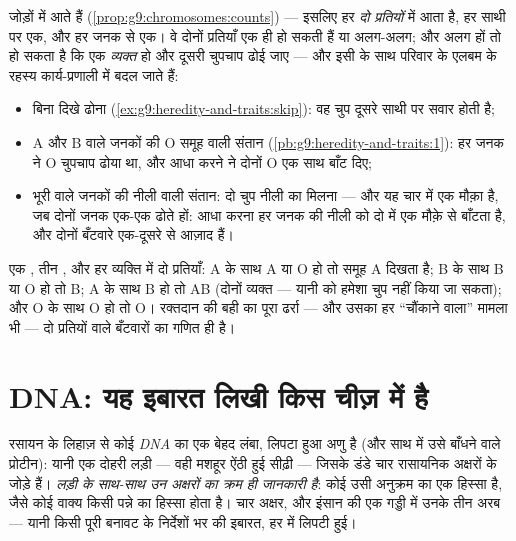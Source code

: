 \begin{proposition}[दो प्रतियाँ, और दिखने का मतलब]\label{prop:g9:genes-and-dna:twocopies}
 जोड़ों में आते हैं (\cref{prop:g9:chromosomes:counts}) ---
इसलिए हर  \emph{दो प्रतियों} में आता है, हर साथी पर एक, और हर जनक से
एक। वे दोनों प्रतियाँ एक ही  हो सकती हैं या अलग-अलग; और अलग हों तो
हो सकता है कि एक \emph{व्यक्त} हो और दूसरी चुपचाप ढोई जाए --- और इसी के
साथ परिवार के एलबम के रहस्य कार्य-प्रणाली में बदल जाते हैं:
\begin{itemize}
  \item बिना दिखे ढोना (\cref{ex:g9:heredity-and-traits:skip}): वह
        चुप  दूसरे साथी पर सवार होती है;
  \item A और B वाले जनकों की O समूह वाली संतान
        (\cref{pb:g9:heredity-and-traits:1}): हर जनक ने O चुपचाप ढोया
        था, और आधा करने ने दोनों O एक साथ बाँट दिए;
  \item भूरी  वाले जनकों की नीली  वाली संतान: दो चुप नीली
         का मिलना --- और यह चार में एक मौक़ा है, जब दोनों जनक
        एक-एक ढोते हों: आधा करना हर जनक की नीली को दो में एक मौक़े से
        बाँटता है, और दोनों बँटवारे एक-दूसरे से आज़ाद हैं।
\end{itemize}
\end{proposition}
\admitted

\begin{example}\label{ex:g9:genes-and-dna:bloodgroups}
एक , तीन , और हर व्यक्ति में दो प्रतियाँ: A के साथ A या O हो
तो समूह A दिखता है; B के साथ B या O हो तो B; A के साथ B हो तो AB (दोनों
व्यक्त --- यानी  को हमेशा चुप नहीं किया जा सकता); और O के साथ
O हो तो O। रक्तदान की बही का पूरा ढर्रा --- और उसका हर ``चौंकाने वाला''
मामला भी --- दो प्रतियों वाले बँटवारों का गणित ही है।
\end{example}

\section{DNA: यह इबारत लिखी किस चीज़ में है}

\begin{definition}[DNA]\label{def:g9:genes-and-dna:dna}
रसायन के लिहाज़ से कोई  \emph{DNA} का एक बेहद लंबा,
लिपटा हुआ अणु है (और साथ में उसे बाँधने वाले प्रोटीन): यानी एक दोहरी लड़ी
--- वही मशहूर ऐंठी हुई सीढ़ी --- जिसके डंडे चार रासायनिक अक्षरों के जोड़े
हैं। \emph{लड़ी के साथ-साथ उन अक्षरों का क्रम ही जानकारी है}: कोई  उसी
अनुक्रम का एक हिस्सा है, जैसे कोई वाक्य किसी पन्ने का हिस्सा होता है। चार
अक्षर, और इंसान की एक गड्डी में उनके तीन अरब --- यानी किसी पूरी बनावट के
निर्देशों भर की इबारत, हर  में लिपटी हुई।
\end{definition}

